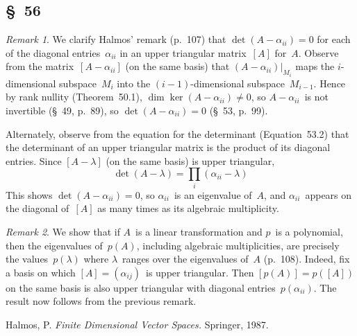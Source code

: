 \documentclass[letterpaper,12pt]{article}
\newcommand{\restrict}[2]{{#1}|_{#2}}
\theoremstyle{definition}
\theoremstyle{remark}
\newtheorem*{rmk}{Remark}
\theoremstyle{direction}
\begin{document}
\subsection*{\S~56}
\begin{rmk}
We clarify Halmos' remark (p.~107) that \(\det(A-\alpha_{ii})=0\) for each of the diagonal entries~\(\alpha_{ii}\) in an upper triangular matrix~\([A]\) for~\(A\). Observe from the matrix~\([A-\alpha_{ii}]\) (on the same basis) that \(\restrict{(A-\alpha_{ii})}{M_i}\) maps the \(i\)-dimensional subspace~\(M_i\) into the \((i-1)\)-dimensional subspace~\(M_{i-1}\). Hence by rank nullity (Theorem~50.1), \(\dim\ker(A-\alpha_{ii})\ne0\), so \(A-\alpha_{ii}\)~is not invertible (\S~49, p.~89), so \(\det(A-\alpha_{ii})=0\) (\S~53, p.~99).

Alternately, observe from the equation for the determinant (Equation~53.2) that the determinant of an upper triangular matrix is the product of its diagonal entries. Since \([A-\lambda]\) (on the same basis) is upper triangular,
\[\det(A-\lambda)=\prod_i(\alpha_{ii}-\lambda)\]
This shows \(\det(A-\alpha_{ii})=0\), so \(\alpha_{ii}\)~is an eigenvalue of~\(A\), and \(\alpha_{ii}\)~appears on the diagonal of~\([A]\) as many times as its algebraic multiplicity.
\end{rmk}

\begin{rmk}
We show that if \(A\)~is a linear transformation and \(p\)~is a polynomial, then the eigenvalues of~\(p(A)\), including algebraic multiplicities, are precisely the values~\(p(\lambda)\) where \(\lambda\)~ranges over the eigenvalues of~\(A\) (p.~108). Indeed, fix a basis on which \([A]=(\alpha_{ij})\)~is upper triangular. Then \([p(A)]=p([A])\) on the same basis is also upper triangular with diagonal entries~\(p(\alpha_{ii})\). The result now follows from the previous remark.
\end{rmk}

\begin{thebibliography}{0}
 Halmos, P. \textit{Finite Dimensional Vector Spaces.} Springer, 1987.
\end{thebibliography}
\end{document}
